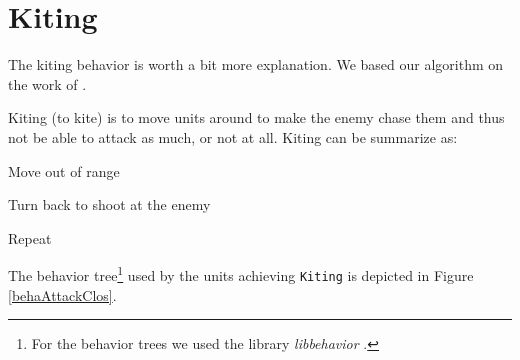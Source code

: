 \section{Kiting}
\label{kiting}

The kiting behavior is worth a bit more explanation. 
We based our algorithm on the work of \cite{kiting}. 

\begin{definition}[Kiting]
    Kiting (to kite) is to move units around to make the enemy chase them and thus not be able to attack as much, or not at all. 
    Kiting can be summarize as:
    \begin{shortitem}
    \item Move out of range
    \item Turn back to shoot at the enemy
    \item Repeat
    \end{shortitem}
\end{definition}

The behavior tree\footnote{
For the behavior trees we used the library \emph{libbehavior} \cite{libbehavior}.
} used by the units achieving \texttt{Kiting} is depicted in Figure \ref{behaAttackClos}.

